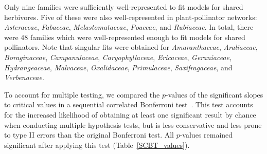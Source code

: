 \documentclass[12pt]{article}
\begin{document}
\begin{spacing}{1.5}
    Only nine families were sufficiently well-represented to fit models for shared herbivores. Five of these were also well-represented in plant-pollinator networks: \emph{Asteraceae}, \emph{Fabaceae}, \emph{Melastomataceae}, \emph{Poaceae}, and \emph{Rubiaceae}. In total, there were 48 families which were well-represented enough to fit models for shared pollinators. Note that singular fits were obtained for \emph{Amaranthaceae}, \emph{Araliaceae}, \emph{Boraginaceae},
    \emph{Campanulaceae}, \emph{Caryophyllaceae}, \emph{Ericaceae}, \emph{Geraniaceae}, 
    \emph{Hydrangeaceae}, \emph{Malvaceae}, \emph{Oxalidaceae}, \emph{Primulaceae}, 
    \emph{Saxifragaceae}, and \emph{Verbenaceae}. 
  

    To account for multiple testing, we compared the $p$-values of the significant slopes to critical values in a sequential correlated Bonferroni test~\citep{Drezner2016}. This test accounts for the increased likelihood of obtaining at least one significant result by chance when conducting multiple hypothesis tests, but is less conservative and less prone to type II errors than the original Bonferroni test. All $p$-values remained significant after applying this test (Table~\ref{SCBT_values}).


\end{spacing}
\end{document}
